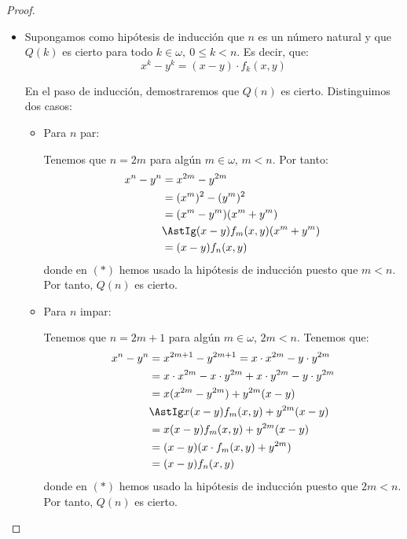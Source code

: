 \begin{ejercicio}
\begin{observacion}
\begin{proof}
\begin{itemize}
                \item Supongamos como hipótesis de inducción que $n$ es un número natural y que $Q(k)$ es cierto para todo $k\in\omega,~0\leq k< n$.
                Es decir, que:
                    \begin{equation*}
                        x^k - y^k = (x-y)\cdot f_k(x, y)
                    \end{equation*}

                    En el paso de inducción, demostraremos que $Q(n)$ es cierto. Distinguimos dos casos:
                    \begin{itemize}
                        \item Para $n$ par:
                        
                        Tenemos que $n=2m$ para algún $m\in\omega$, $m<n$. Por tanto:
                        \begin{align*}
                            x^n - y^n &= x^{2m} - y^{2m} \\
                            &= (x^m)^2 - (y^m)^2 \\
                            &= (x^m - y^m)(x^m + y^m)\\
                            &\AstIg (x-y)f_m(x, y)(x^m + y^m)\\
                            &= (x-y)f_{n}(x, y)
                        \end{align*}
                        donde en $(\ast)$ hemos usado la hipótesis de inducción puesto que $m<n$. Por tanto, $Q(n)$ es cierto.
                        
                        \item Para $n$ impar:
                        
                        Tenemos que $n=2m+1$ para algún $m\in\omega$, $2m<n$. Tenemos que:
                        \begin{align*}
                            x^n - y^n &= x^{2m+1} - y^{2m+1} = x\cdot x^{2m} - y\cdot y^{2m} \\
                            &= x\cdot x^{2m} - x\cdot y^{2m} + x\cdot y^{2m} - y\cdot y^{2m} \\
                            &= x(x^{2m} - y^{2m}) + y^{2m}(x-y)\\
                            &\AstIg x(x-y)f_m(x, y) + y^{2m}(x-y) \\
                            &= x(x-y)f_m(x, y) + y^{2m}(x-y) \\
                            &= (x-y)(x\cdot f_m(x, y) + y^{2m}) \\
                            &= (x-y)f_{n}(x, y)
                        \end{align*}
                        donde en $(\ast)$ hemos usado la hipótesis de inducción puesto que $2m<n$. Por tanto, $Q(n)$ es cierto.
                    \end{itemize}
            \end{itemize}


\end{proof}
\end{observacion}
\end{ejercicio}
